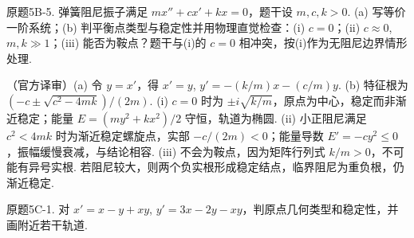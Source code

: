\begin{solution}
\begin{center}
\end{center}
\end{solution}
\begin{exercise}\label{cw:bank-5B-5}原题5B-5. 弹簧阻尼振子满足 $mx''+cx'+kx=0$，题干设 $m,c,k>0$. (a) 写等价一阶系统；(b) 判平衡点类型与稳定性并用物理直觉检查：(i) $c=0$；(ii) $c\approx0$, $m,k\gg1$；(iii) 能否为鞍点？题干与(i)的 $c=0$ 相冲突，按(i)作为无阻尼边界情形处理.\end{exercise}
\begin{solution}（官方译审）(a) 令 $y=x'$，得 $x'=y$, $y'=-(k/m)x-(c/m)y$. (b) 特征根为 $(-c\pm\sqrt{c^2-4mk})/(2m)$. (i) $c=0$ 时为 $\pm i\sqrt{k/m}$，原点为中心，稳定而非渐近稳定；能量 $E=(my^2+kx^2)/2$ 守恒，轨道为椭圆. (ii) 小正阻尼满足 $c^2<4mk$ 时为渐近稳定螺旋点，实部 $-c/(2m)<0$；能量导数 $E'=-cy^2\le0$，振幅缓慢衰减，与结论相容. (iii) 不会为鞍点，因为矩阵行列式 $k/m>0$，不可能有异号实根. 若阻尼较大，则两个负实根形成稳定结点，临界阻尼为重负根，仍渐近稳定.\end{solution}
\begin{exercise}\label{cw:bank-5C-1}原题5C-1. 对 $x'=x-y+xy$, $y'=3x-2y-xy$，判原点几何类型和稳定性，并画附近若干轨道.\end{exercise}
